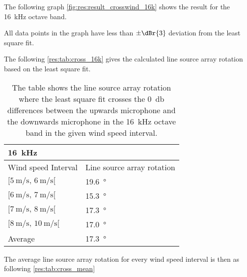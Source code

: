  The following graph \autoref{fig:res:result_crosswind_16k} shows the result for the \SI{16}{\kilo\hertz} octave band. 
 

 All data points in the graph have less than $\pm \dBr{3}$ deviation from the least square fit.
 
 The following \autoref{res:tab:cross_16k} gives the calculated line source array rotation based on the least square fit.  
  
 \begin{table}[H]
 \centering
  \caption{The table shows the line source array rotation where the least square fit crosses the \SI{0}{\decibel} differences between the upwards microphone and the downwards microphone in the \SI{16}{\kilo\hertz} octave band in the given wind speed interval.}
\begin{tabular}{l|l}
\multicolumn{2}{l}{\SI{16}{\kilo\hertz}}      \\ \hline
Wind speed Interval & Line source array rotation \\ \hline
  $[\SI{5}{\meter\per\second},\, \SI{6}{\meter\per\second}[ $       &   \SI{19.6}{\degree}    \\
    $[\SI{6}{\meter\per\second},\, \SI{7}{\meter\per\second}[ $     &   \SI{15.3}{\degree}     \\
  $[\SI{7}{\meter\per\second},\, \SI{8}{\meter\per\second}[ $       &    \SI{17.3}{\degree}    \\
   $[\SI{8}{\meter\per\second},\, \SI{10}{\meter\per\second}[ $      &     \SI{17.0}{\degree}  \\ \hline
    Average      &     \SI{17.3}{\degree} 
\end{tabular}
\label{res:tab:cross_16k}
\end{table}    
 
 
The average line source array rotation for every wind speed interval is then as following \autoref{res:tab:cross_mean}

